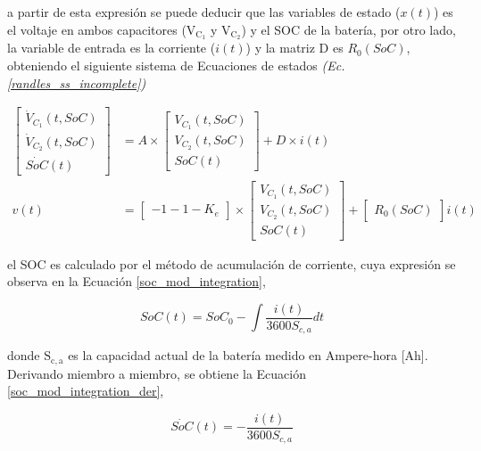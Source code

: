 \documentclass[10pt, a4paper]{report}
\begin{document}
a partir de esta expresi\'on se puede deducir que las variables de estado 
($x(t)$) es el voltaje en ambos capacitores ($\mathrm{V_{C_1}}$ y 
$\mathrm{V_{C_2}}$) y el \acrshort{SOC} de la bater\'ia, por otro lado, la 
variable de entrada es la corriente ($i(t)$) y la matriz D es $R_0(SoC)$, 
obteniendo el siguiente sistema de Ecuaciones de estados 
\emph{(Ec. \ref{randles_ss_incomplete})}

\begin{align}
    \begin{bmatrix}
        \dot{V}_{C_1}(t, SoC) \\ \dot{V}_{C_2}(t, SoC) \\ \dot{SoC}(t)
    \end{bmatrix} &= 
    A\times\begin{bmatrix}V_{C_1}(t, SoC) \\ V_{C_2}(t, SoC) \\ SoC(t)\end{bmatrix}
    +
    D\times i(t)\nonumber \\
    v(t) &= \begin{bmatrix} -1 -1 -K_e \end{bmatrix} \times 
    \begin{bmatrix} V_{C_1}(t, SoC) \\ V_{C_2}(t, SoC) \\ SoC(t) \end{bmatrix} +
    \begin{bmatrix} R_0(SoC) \end{bmatrix} i(t)\label{randles_ss_incomplete}
\end{align}

el \acrshort{SOC} es calculado por el m\'etodo de acumulaci\'on de
corriente, cuya expresi\'on se observa en la Ecuaci\'on
\ref{soc_mod_integration},

\begin{equation}
    SoC(t) = SoC_{0}  - \int \frac{i\left(t\right)}{3600 S_{c,a}} dt
    \label{soc_mod_integration}
\end{equation}

donde $\mathrm{S_{c,a}}$ es la capacidad actual de la bater\'ia medido en
Ampere-hora [Ah]. Derivando miembro a miembro, se obtiene la Ecuaci\'on
\ref{soc_mod_integration_der},

\begin{equation}
    \dot{SoC}(t) = - \frac{i(t)}{3600S_{c,a}}\label{soc_mod_integration_der}
\end{equation}
\end{document}
